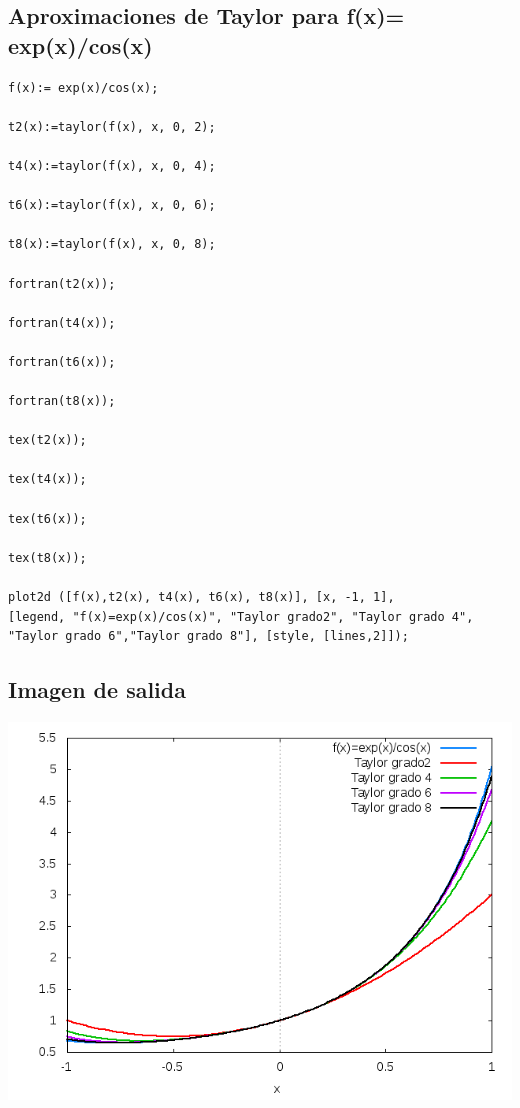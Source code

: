 \documentclass[letterpaper,10pt,twoside,onecolumn]{article}
\begin{document}
\subsection{Aproximaciones de Taylor para f(x)= exp(x)/cos(x) }
\begin{verbatim}
f(x):= exp(x)/cos(x);

t2(x):=taylor(f(x), x, 0, 2);

t4(x):=taylor(f(x), x, 0, 4);

t6(x):=taylor(f(x), x, 0, 6);

t8(x):=taylor(f(x), x, 0, 8);

fortran(t2(x));

fortran(t4(x));

fortran(t6(x));

fortran(t8(x));

tex(t2(x));

tex(t4(x));

tex(t6(x));

tex(t8(x));

plot2d ([f(x),t2(x), t4(x), t6(x), t8(x)], [x, -1, 1], 
[legend, "f(x)=exp(x)/cos(x)", "Taylor grado2", "Taylor grado 4", 
"Taylor grado 6","Taylor grado 8"], [style, [lines,2]]);
\end{verbatim}     
\subsection{Imagen de salida}
\includegraphics[scale=.55]{ExpCos.png}
\end{document}
